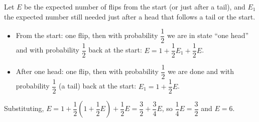 Let $E$ be the expected number of flips from the start (or just after a tail), and $E_1$ the expected number still needed just after a head that follows a tail or the start.
\begin{itemize}
\item From the start: one flip, then with probability $\dfrac{1}{2}$ we are in state ``one head'' and with probability $\dfrac{1}{2}$ back at the start: $E=1+\dfrac{1}{2}E_1+\dfrac{1}{2}E$.
\item After one head: one flip, then with probability $\dfrac{1}{2}$ we are done and with probability $\dfrac{1}{2}$ (a tail) back at the start: $E_1=1+\dfrac{1}{2}E$.
\end{itemize}
Substituting, $E=1+\dfrac{1}{2}\left(1+\dfrac{1}{2}E\right)+\dfrac{1}{2}E=\dfrac{3}{2}+\dfrac{3}{4}E$, so $\dfrac{1}{4}E=\dfrac{3}{2}$ and $E=\boxed{6}$.
